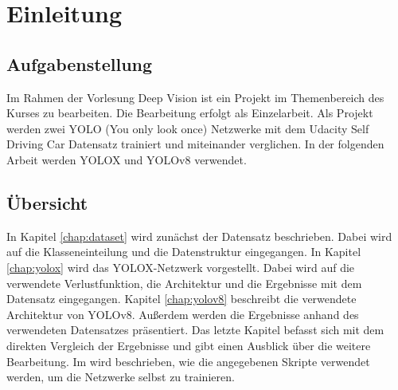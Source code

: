 \chapter{Einleitung}

\section{Aufgabenstellung}
Im Rahmen der Vorlesung Deep Vision ist ein Projekt im Themenbereich des Kurses zu bearbeiten. Die Bearbeitung erfolgt als Einzelarbeit. Als Projekt werden zwei YOLO (You only look once) Netzwerke mit dem Udacity Self Driving Car Datensatz trainiert und miteinander verglichen. In der folgenden Arbeit werden YOLOX und YOLOv8 verwendet.


\section{Übersicht}
In Kapitel \ref{chap:dataset} wird zunächst der Datensatz beschrieben. Dabei wird auf die Klasseneinteilung und die Datenstruktur eingegangen. In Kapitel \ref{chap:yolox} wird das YOLOX-Netzwerk vorgestellt. Dabei wird auf die verwendete Verlustfunktion, die Architektur und die Ergebnisse mit dem Datensatz eingegangen. Kapitel \ref{chap:yolov8} beschreibt die verwendete Architektur von YOLOv8. Außerdem werden die Ergebnisse anhand des verwendeten Datensatzes präsentiert. Das letzte Kapitel  befasst sich mit dem direkten Vergleich der Ergebnisse und gibt einen Ausblick über die weitere Bearbeitung. Im  wird beschrieben, wie die angegebenen Skripte verwendet werden, um die Netzwerke selbst zu trainieren.


